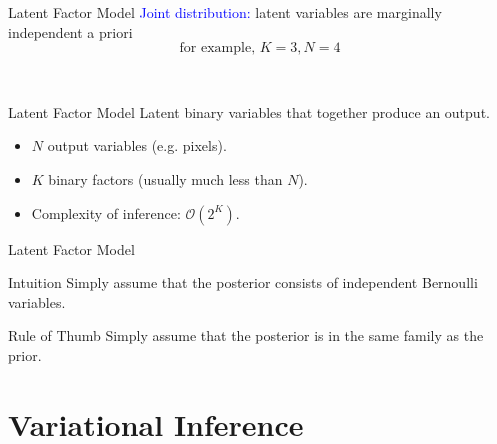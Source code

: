 \documentclass[14pt, aspectratio=169]{beamer}
\begin{document}
\begin{frame}{Latent Factor Model}
\textcolor{blue}{Joint distribution:} latent variables are marginally independent a priori\\
$$\text{for example, }K=3, N=4$$
\begin{figure}
\center
{}
\end{figure}

~


\end{frame}

\begin{frame}{Latent Factor Model}
Latent binary variables that together produce an output.
\begin{itemize}
\item $ N $ output variables (e.g. pixels).
\item $ K $ binary factors (usually much less than $ N $).
\item Complexity of inference: $ \mathcal{O}(2^{K}) $.
\end{itemize}
\end{frame}

\begin{frame}{Latent Factor Model}
\begin{block}{Intuition}
Simply assume that the posterior consists of independent Bernoulli variables.
\end{block}
\pause
\begin{block}{Rule of Thumb}
Simply assume that the posterior is in the same family as the prior.
\end{block}
\end{frame}


\section{Variational Inference}
\frame{\tableofcontents[currentsection]}
\end{document}
